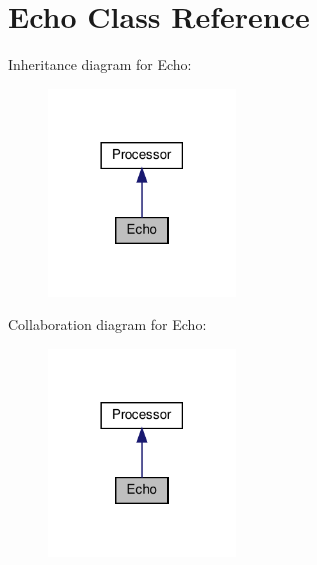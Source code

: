 \hypertarget{classEcho}{}\section{Echo Class Reference}
\label{classEcho}


Inheritance diagram for Echo\+:
\nopagebreak
\begin{figure}[H]
\begin{center}
\leavevmode
\includegraphics[width=141pt]{d1/dd3/classEcho__inherit__graph}
\end{center}
\end{figure}


Collaboration diagram for Echo\+:
\nopagebreak
\begin{figure}[H]
\begin{center}
\leavevmode
\includegraphics[width=141pt]{da/d44/classEcho__coll__graph}
\end{center}
\end{figure}
